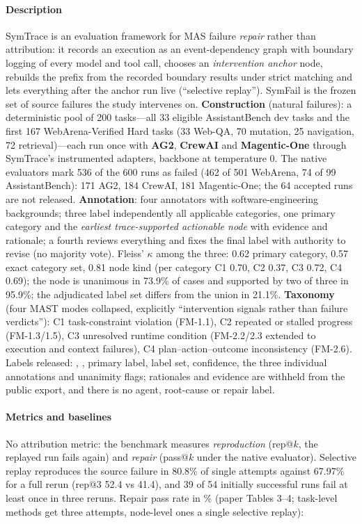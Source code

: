 \paragraph{Description} SymTrace is an evaluation framework for MAS failure \emph{repair} rather than attribution: it records an execution as an event-dependency graph with boundary logging of every model and tool call, chooses an \emph{intervention anchor} node, rebuilds the prefix from the recorded boundary results under strict matching and lets everything after the anchor run live (``selective replay''). SymFail is the frozen set of source failures the study intervenes on. \textbf{Construction} (natural failures): a deterministic pool of 200 tasks---all 33 eligible AssistantBench dev tasks and the first 167 WebArena-Verified Hard tasks (33 Web-QA, 70 mutation, 25 navigation, 72 retrieval)---each run once with \textbf{AG2}, \textbf{CrewAI} and \textbf{Magentic-One} through SymTrace's instrumented adapters, backbone  at temperature 0. The native evaluators mark 536 of the 600 runs as failed (462 of 501 WebArena, 74 of 99 AssistantBench): 171 AG2, 184 CrewAI, 181 Magentic-One; the 64 accepted runs are not released. \textbf{Annotation}: four annotators with software-engineering backgrounds; three label independently all applicable categories, one primary category and the \emph{earliest trace-supported actionable node} with evidence and rationale; a fourth reviews everything and fixes the final label with authority to revise (no majority vote). Fleiss' $\kappa$ among the three: 0.62 primary category, 0.57 exact category set, 0.81 node kind (per category C1 0.70, C2 0.37, C3 0.72, C4 0.69); the node is unanimous in 73.9\% of cases and supported by two of three in 95.9\%; the adjudicated label set differs from the union in 21.1\%. \textbf{Taxonomy} (four MAST modes collapsed, explicitly ``intervention signals rather than failure verdicts''): C1 task-constraint violation (FM-1.1), C2 repeated or stalled progress (FM-1.3/1.5), C3 unresolved runtime condition (FM-2.2/2.3 extended to execution and context failures), C4 plan--action--outcome inconsistency (FM-2.6). Labels released: , , primary label, label set, confidence, the three individual annotations and unanimity flags; rationales and evidence are withheld from the public export, and there is no agent, root-cause or repair label.

\paragraph{Metrics and baselines} No attribution metric: the benchmark measures \emph{reproduction} (rep@$k$, the replayed run fails again) and \emph{repair} (pass@$k$ under the native evaluator). Selective replay reproduces the source failure in 80.8\% of single attempts against 67.97\% for a full rerun (rep@3 52.4 vs 41.4), and 39 of 54 initially successful runs fail at least once in three reruns. Repair pass rate in \% (paper Tables 3--4; task-level methods get three attempts, node-level ones a single selective replay):

